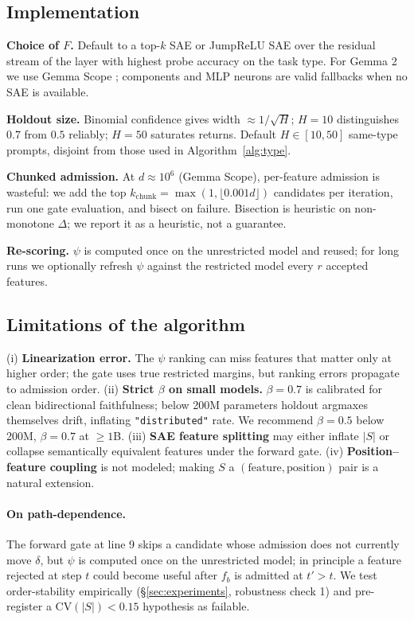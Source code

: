 \documentclass[10pt]{article}
\begin{document}
\subsection{Implementation}

\textbf{Choice of $F$.} Default to a top-$k$ SAE \citep{gao2024scaling} or JumpReLU SAE \citep{rajamanoharan2024jumprelu} over the residual stream of the layer with highest probe accuracy on the task type. For Gemma 2 we use Gemma Scope \citep{lieberum2024gemma}; components and MLP neurons are valid fallbacks when no SAE is available.

\textbf{Holdout size.} Binomial confidence gives width $\approx 1/\sqrt H$; $H=10$ distinguishes $0.7$ from $0.5$ reliably; $H=50$ saturates returns. Default $H \in [10, 50]$ same-type prompts, disjoint from those used in Algorithm~\ref{alg:type}.

\textbf{Chunked admission.} At $d \approx 10^6$ (Gemma Scope), per-feature admission is wasteful: we add the top $k_{\text{chunk}} = \max(1, \lfloor 0.001 d \rfloor)$ candidates per iteration, run one gate evaluation, and bisect on failure. Bisection is heuristic on non-monotone $\Delta$; we report it as a heuristic, not a guarantee.

\textbf{Re-scoring.} $\psi$ is computed once on the unrestricted model and reused; for long runs we optionally refresh $\psi$ against the restricted model every $r$ accepted features.

\subsection{Limitations of the algorithm}

(i) \textbf{Linearization error.} The $\psi$ ranking can miss features that matter only at higher order; the gate uses true restricted margins, but ranking errors propagate to admission order. (ii) \textbf{Strict $\beta$ on small models.} $\beta = 0.7$ is calibrated for clean bidirectional faithfulness; below 200M parameters holdout argmaxes themselves drift, inflating \texttt{"distributed"} rate. We recommend $\beta = 0.5$ below 200M, $\beta = 0.7$ at $\geq 1$B. (iii) \textbf{SAE feature splitting} \citep{engels2024darkmatter,chanin2024absorption} may either inflate $|S|$ or collapse semantically equivalent features under the forward gate. (iv) \textbf{Position--feature coupling} is not modeled; making $S$ a $(\text{feature}, \text{position})$ pair is a natural extension.

\paragraph{On path-dependence.} The forward gate at line 9 skips a candidate whose admission does not currently move $\delta$, but $\psi$ is computed once on the unrestricted model; in principle a feature rejected at step $t$ could become useful after $f_b$ is admitted at $t' > t$. We test order-stability empirically (\S\ref{sec:experiments}, robustness check 1) and pre-register a $\mathrm{CV}(|S|) < 0.15$ hypothesis as failable.
\end{document}
